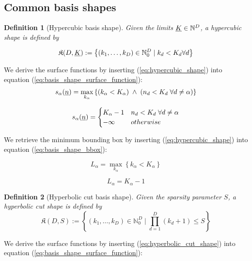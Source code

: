 \documentclass{article}
\newtheorem{definition}{Definition}
\begin{document}
\subsection{Common basis shapes}
\begin{definition}[Hypercubic basis shape]
  Given the limits \(\underline{K} \in \mathbb{N}^D\), a hypercubic shape is defined by

  \begin{equation}
    \label{eq:hypercubic_shape}
    \mathfrak{K}(D,\underline{K}):=\left\{(k_1,\dots,k_D) \in \mathbb{N}_0^D \;|\; k_d < K_d \forall d\right\}
  \end{equation}
\end{definition}

We derive the surface functions by inserting (\ref{eq:hypercubic_shape}) into
equation
(\ref{eq:basis_shape_surface_function}):
\[
  s_{\alpha}(\underline{n})=\max_{k_{\alpha}}\left\{(k_{\alpha}<K_{\alpha}) \;\land\;
    (n_d < K_d \;\forall d \neq \alpha)\right\}
\]

\begin{equation}
  s_{\alpha}(\underline{n})=
  \begin{cases}
    K_{\alpha}-1 & n_d < K_d \;\forall d \neq \alpha \\
    -\infty & otherwise \\
  \end{cases}
\end{equation}

We retrieve the minimum bounding box by inserting (\ref{eq:hypercubic_shape}) into
equation
(\ref{eq:basis_shape_bbox}):

\[
L_{\alpha}=\max_{k_{\alpha}}\left\{k_{\alpha}<K_{\alpha}\right\}
\]

\begin{equation}
L_{\alpha}=K_{\alpha}-1
\end{equation}

\begin{definition}[Hyperbolic cut basis shape]
  Given the sparsity parameter \(S\), a hyperbolic cut shape is defined by
  \begin{equation}
    \mathfrak{K}(D,S):=\left\{(k_1,\dots,k_D) \in \mathbb{N}_0^D \;|\;\prod_{d=1}^D(k_d+1) \leq S\right\}
    \label{eq:hyperbolic_cut_shape}
  \end{equation}
\end{definition}

We derive the surface functions by inserting (\ref{eq:hyperbolic_cut_shape}) into
equation (\ref{eq:basis_shape_surface_function}):
\end{document}
